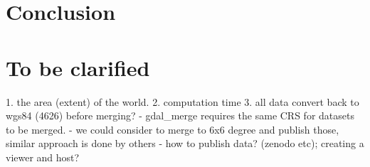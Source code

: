 \documentclass{article}
\begin{document}
\section{Conclusion}




 \section{To be clarified}

 1. the area (extent) of the world.   
 2. computation time
 3. all data convert back to wgs84 (4626) before merging?
 - gdal\_merge requires the same CRS for datasets to be merged. 
- we could consider to merge to 6x6 degree and publish those, similar approach is done by others
- how to publish data? (zenodo etc); creating a viewer and host?
\end{document}
